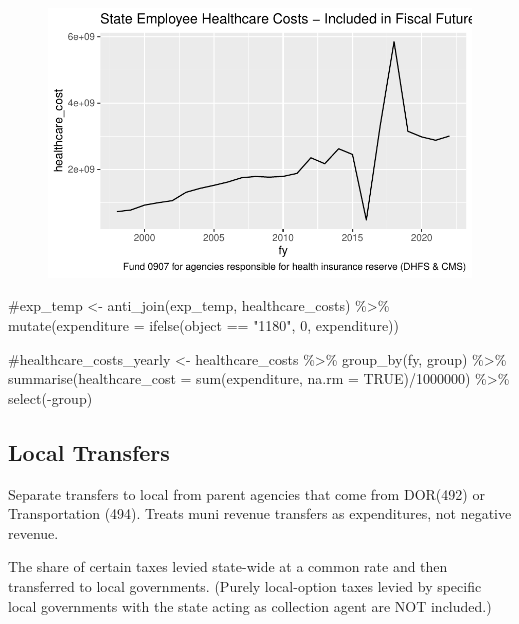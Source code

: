 \documentclass[
  letterpaper,
  DIV=11,
  numbers=noendperiod]{scrreport}
\newenvironment{Shaded}{\begin{snugshade}}{\end{snugshade}}
\newcommand{\CommentTok}[1]{\textcolor[rgb]{0.37,0.37,0.37}{#1}}
\begin{document}
\begin{figure}[H]

{\centering \includegraphics{./Everything_files/figure-pdf/eehc1-1.pdf}

}

\end{figure}

\begin{Shaded}
\begin{Highlighting}[]
\CommentTok{\#exp\_temp \textless{}{-} anti\_join(exp\_temp, healthcare\_costs) \%\textgreater{}\% mutate(expenditure = ifelse(object == "1180", 0, expenditure))}

\CommentTok{\#healthcare\_costs\_yearly \textless{}{-} healthcare\_costs \%\textgreater{}\% group\_by(fy, group) \%\textgreater{}\% summarise(healthcare\_cost = sum(expenditure, na.rm = TRUE)/1000000) \%\textgreater{}\% select({-}group)}
\end{Highlighting}
\end{Shaded}

\hypertarget{local-transfers-1}{%
\subsection{Local Transfers}\label{local-transfers-1}}

Separate transfers to local from parent agencies that come from DOR(492)
or Transportation (494). Treats muni revenue transfers as expenditures,
not negative revenue.

The share of certain taxes levied state-wide at a common rate and then
transferred to local governments. (Purely local-option taxes levied by
specific local governments with the state acting as collection agent are
NOT included.)
\end{document}

